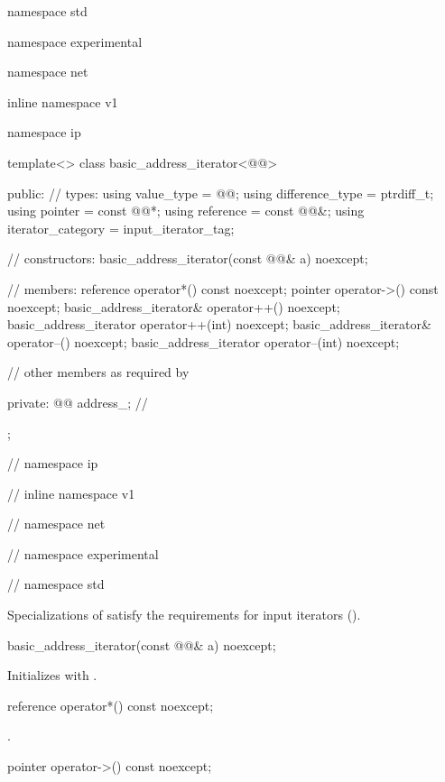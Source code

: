 \begin{codeblock}
namespace std {
namespace experimental {
namespace net {
inline namespace v1 {
namespace ip {

  template<> class basic_address_iterator<@@>
  {
  public:
    // types:
    using value_type = @@;
    using difference_type = ptrdiff_t;
    using pointer = const @@*;
    using reference = const @@&;
    using iterator_category = input_iterator_tag;

    // constructors:
    basic_address_iterator(const @@& a) noexcept;

    // members:
    reference operator*() const noexcept;
    pointer operator->() const noexcept;
    basic_address_iterator& operator++() noexcept;
    basic_address_iterator operator++(int) noexcept;
    basic_address_iterator& operator--() noexcept;
    basic_address_iterator operator--(int) noexcept;

    // other members as required by 

  private:
    @@ address_; // \expos
  };

} // namespace ip
} // inline namespace v1
} // namespace net
} // namespace experimental
} // namespace std
\end{codeblock}

\pnum
Specializations of  satisfy the requirements for input iterators ().

\begin{itemdecl}
basic_address_iterator(const @@& a) noexcept;
\end{itemdecl}

\begin{itemdescr}
\pnum
\effects Initializes  with .
\end{itemdescr}

\begin{itemdecl}
reference operator*() const noexcept;
\end{itemdecl}

\begin{itemdescr}
\pnum
\returns {}.
\end{itemdescr}

\begin{itemdecl}
pointer operator->() const noexcept;
\end{itemdecl}

